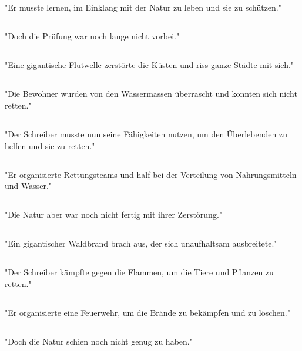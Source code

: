 \documentclass{article}
\begin{document}
\subsection{}
"Er musste lernen, im Einklang mit der Natur zu leben und sie zu schützen."
\subsection{}
"Doch die Prüfung war noch lange nicht vorbei."
\subsection{}
"Eine gigantische Flutwelle zerstörte die Küsten und riss ganze Städte mit sich."
\subsection{}
"Die Bewohner wurden von den Wassermassen überrascht und konnten sich nicht retten."
\subsection{}
"Der Schreiber musste nun seine Fähigkeiten nutzen, um den Überlebenden zu helfen und sie zu retten."
\subsection{}
"Er organisierte Rettungsteams und half bei der Verteilung von Nahrungsmitteln und Wasser."
\subsection{}
"Die Natur aber war noch nicht fertig mit ihrer Zerstörung."
\subsection{}
"Ein gigantischer Waldbrand brach aus, der sich unaufhaltsam ausbreitete."
\subsection{}
"Der Schreiber kämpfte gegen die Flammen, um die Tiere und Pflanzen zu retten."
\subsection{}
"Er organisierte eine Feuerwehr, um die Brände zu bekämpfen und zu löschen."
\subsection{}
"Doch die Natur schien noch nicht genug zu haben."
\end{document}
